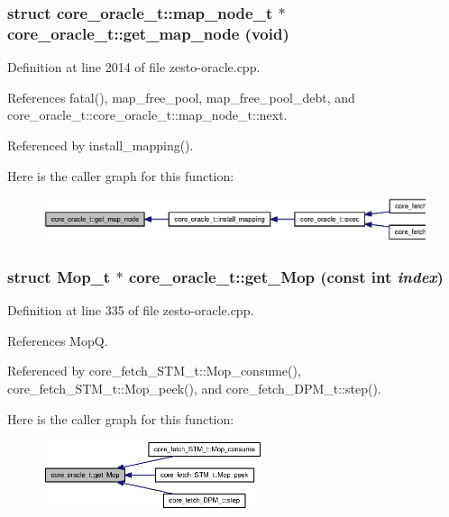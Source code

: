 \subsubsection[{get\_\-map\_\-node}]{\setlength{\rightskip}{0pt plus 5cm}struct {\bf core\_\-oracle\_\-t::map\_\-node\_\-t} $\ast$ core\_\-oracle\_\-t::get\_\-map\_\-node (void)\hspace{0.3cm}{\tt  [read, protected]}}\label{classcore__oracle__t_1d625a959241c89446eb56ea68c374cc}




Definition at line 2014 of file zesto-oracle.cpp.

References fatal(), map\_\-free\_\-pool, map\_\-free\_\-pool\_\-debt, and core\_\-oracle\_\-t::core\_\-oracle\_\-t::map\_\-node\_\-t::next.

Referenced by install\_\-mapping().

Here is the caller graph for this function:\nopagebreak
\begin{figure}[H]
\begin{center}
\leavevmode
\includegraphics[width=334pt]{classcore__oracle__t_1d625a959241c89446eb56ea68c374cc_icgraph}
\end{center}
\end{figure}
\subsubsection[{get\_\-Mop}]{\setlength{\rightskip}{0pt plus 5cm}struct {\bf Mop\_\-t} $\ast$ core\_\-oracle\_\-t::get\_\-Mop (const int {\em index})\hspace{0.3cm}{\tt  [read]}}\label{classcore__oracle__t_476405605981d10733d94063d4441dfe}




Definition at line 335 of file zesto-oracle.cpp.

References MopQ.

Referenced by core\_\-fetch\_\-STM\_\-t::Mop\_\-consume(), core\_\-fetch\_\-STM\_\-t::Mop\_\-peek(), and core\_\-fetch\_\-DPM\_\-t::step().

Here is the caller graph for this function:\nopagebreak
\begin{figure}[H]
\begin{center}
\leavevmode
\includegraphics[width=182pt]{classcore__oracle__t_476405605981d10733d94063d4441dfe_icgraph}
\end{center}
\end{figure}
